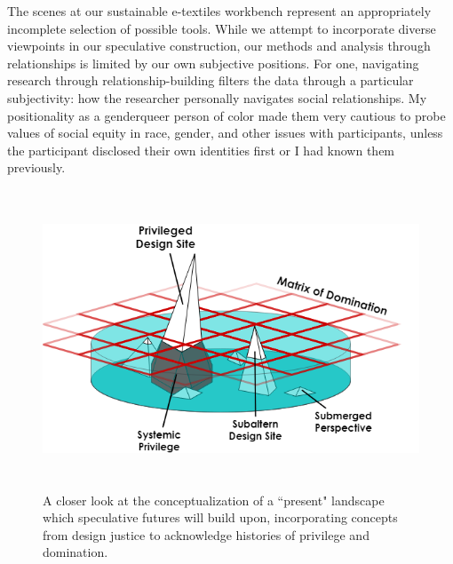 The scenes at our sustainable e-textiles workbench represent an appropriately incomplete selection of possible tools. While we attempt to incorporate diverse viewpoints in our speculative construction, our methods and analysis through relationships is limited by our own subjective positions.
For one, navigating research through relationship-building filters the data through a particular subjectivity: how the researcher personally navigates social relationships. My positionality as a genderqueer person of color made them very cautious to probe values of social equity in race, gender, and other issues with participants, unless the participant disclosed their own identities first or I had known them previously.

\begin{figure}[ht]
  \centering
  \includegraphics[height=3.5in]{figs/EST_Matrix of Dom_Submerged Perspectives.png}
  \caption[An illustration of the ``present'' point of the futures cone incorporating design justice concepts.]{A closer look at the conceptualization of a ``present" landscape which speculative futures will build upon, incorporating concepts from design justice to acknowledge histories of privilege and domination.}
  \label{fig:matrix-of-domination}
\end{figure}

